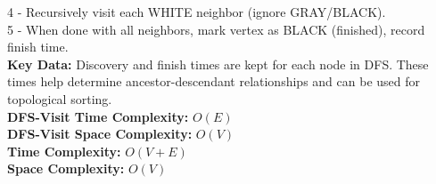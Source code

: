 {\begin{minipage}[t]{1.1\linewidth}
\begin{minipage}[t]{0.45\linewidth}
4 - Recursively visit each WHITE neighbor (ignore GRAY/BLACK).\\
5 - When done with all neighbors, mark vertex as BLACK (finished), record finish time.\\
\textbf{Key Data:} Discovery and finish times are kept for each node in DFS. These times help determine ancestor-descendant relationships and can be used for topological sorting.\\
\textbf{DFS-Visit Time Complexity:} $O(E)$\\
\textbf{DFS-Visit Space Complexity:} $O(V)$\\
\textbf{Time Complexity:} $O(V + E)$\\ \textbf{Space Complexity:} $O(V)$\\[-13px]

\begin{minipage}[t]{0.38\linewidth}
\end{minipage}
\begin{minipage}[t]{0.58\linewidth}
\end{minipage}
\end{minipage}\\[-8px]
\begin{minipage}[t]{0.45\linewidth}
    \vspace*{-10px}
\end{minipage}
\end{minipage}}
